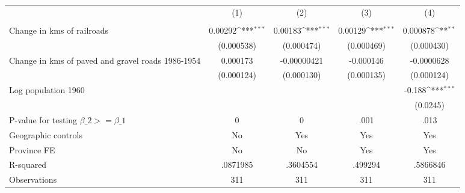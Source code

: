 {
\def\sym#1{\ifmmode^{#1}\else\(^{#1}\)\fi}
\begin{tabular}{l*{4}{c}}
\hline\hline
                &\multicolumn{1}{c}{(1)}&\multicolumn{1}{c}{(2)}&\multicolumn{1}{c}{(3)}&\multicolumn{1}{c}{(4)}\\
                &\multicolumn{1}{c}{}&\multicolumn{1}{c}{}&\multicolumn{1}{c}{}&\multicolumn{1}{c}{}\\
\hline
Change in kms of railroads&  0.00292\sym{***}&  0.00183\sym{***}&  0.00129\sym{***}& 0.000878\sym{**} \\
                &(0.000538)         &(0.000474)         &(0.000469)         &(0.000430)         \\
[1em]
Change in kms of paved and gravel roads 1986-1954& 0.000173         &-0.00000421         &-0.000146         &-0.0000628         \\
                &(0.000124)         &(0.000130)         &(0.000135)         &(0.000124)         \\
[1em]
Log population 1960&                  &                  &                  &   -0.188\sym{***}\\
                &                  &                  &                  & (0.0245)         \\
\hline
P-value for testing $\beta\_{2} >= \beta\_{1}$&        0         &        0         &     .001         &     .013         \\
Geographic controls&       No         &      Yes         &      Yes         &      Yes         \\
Province FE     &       No         &       No         &      Yes         &      Yes         \\
R-squared       & .0871985         & .3604554         &  .499294         & .5866846         \\
Observations    &      311         &      311         &      311         &      311         \\
\hline\hline
\end{tabular}
}
